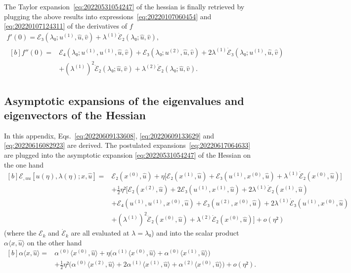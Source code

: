 \documentclass[12pt, final]{scrartcl}
\theoremstyle{definition}
\newcommand{\E}{\mathcal E}
\newcommand{\order}[2][1]{#2^{(#1)}}
\begin{document}
The Taylor expansion~\eqref{eq:20220531054247} of the hessian is finally
retrieved by plugging the above results into
expressions~\eqref{eq:20220107060454} and \eqref{eq:20220107124311} of the
derivatives of $f$
\begin{gather*}
  f'(0) = \E₃(\lambda₀; \order[1]u, \hat{u}, \hat{v}) + \order[1]\lambda \dot{\E}₂(\lambda₀; \hat{u}, \hat{v}),\\
  \begin{aligned}[b]
    f''(0) = {} & \E₄(\lambda₀; \order[1]u, \order[1]u, \hat{u}, \hat{v}) + \E₃(\lambda₀; \order[2]u, \hat{u}, \hat{v}) + 2\order[1]\lambda \dot{\E}₃(\lambda₀; \order[1]u, \hat{u}, \hat{v})\\
                & + ( \order[1]\lambda )^2 \ddot{\E}₂(\lambda₀; \hat{u}, \hat{v}) + \order[2]\lambda \dot{\E}₂(\lambda₀; \hat{u}, \hat{v}).
  \end{aligned}
\end{gather*}

\subsection{Asymptotic expansions of the eigenvalues and eigenvectors of the Hessian}
\label{sec:20220616074108}

In this appendix, Eqs.~\eqref{eq:20220609133608}, \eqref{eq:20220609133629} and
\eqref{eq:20220616082923} are derived. The postulated
expansions~\eqref{eq:20220617064633} are plugged into the asymptotic expansion
\eqref{eq:20220531054247} of the Hessian on the one hand
\begin{equation*}
  \begin{aligned}[b]
    \E_{, uu} [u(η), \lambda(η); x, \hat{u}] ={}
    & \E₂(\order[0]x, \hat{u}) + η \bigl[ \E₂(\order[1]x, \hat{u}) + \E₃(\order[1]u, \order[0]x, \hat{u}) + \order[1]\lambda \dot{\E}₂(\order[0]x, \hat{u})\bigr]\\
    & + \tfrac{1}{2} η² \bigl[\E₂(\order[2]x, \hat{u}) + 2\E₃(\order[1]u, \order[1]x, \hat{u}) + 2 \order[1]\lambda \dot{\E}₂(\order[1]x, \hat{u})\\
    & + \E₄(\order[1]u, \order[1]u, \order[0]x, \hat{u}) + \E₃(\order[2]u, \order[0]x, \hat{u}) + 2\order[1]\lambda \dot{\E}₃(\order[1]u, \order[0]x, \hat{u})\\
    & + ( \order[1]\lambda )^2 \ddot{\E}₂(\order[0]x, \hat{u}) + \order[2]\lambda \dot{\E}₂(\order[0]x, \hat{u}) \bigr] + o(η²)
  \end{aligned}
\end{equation*}
(where the $\E_k$ and $\dot{\E}_k$ are all evaluated at $\lambda=\lambda₀$) and into the
scalar product $α 〈 x, \hat{u} 〉$ on the other hand
\begin{equation*}
  \begin{aligned}[b]
    α 〈 x, \hat{u} 〉 ={}
    & \order[0]α 〈 \order[0]x, \hat{u} 〉 + η \bigl(\order[1]α 〈 \order[0]x, \hat{u} 〉 + \order[0]α 〈 \order[1]x, \hat{u} 〉\bigr)\\
    & + \tfrac{1}{2} η² \bigl(\order[0]α 〈 \order[2]x, \hat{u} 〉 + 2 \order[1]α 〈 \order[1]x, \hat{u} 〉 + \order[2]α 〈 \order[0]x, \hat{u} 〉\bigr) + o(η²).
  \end{aligned}
\end{equation*}
\end{document}
